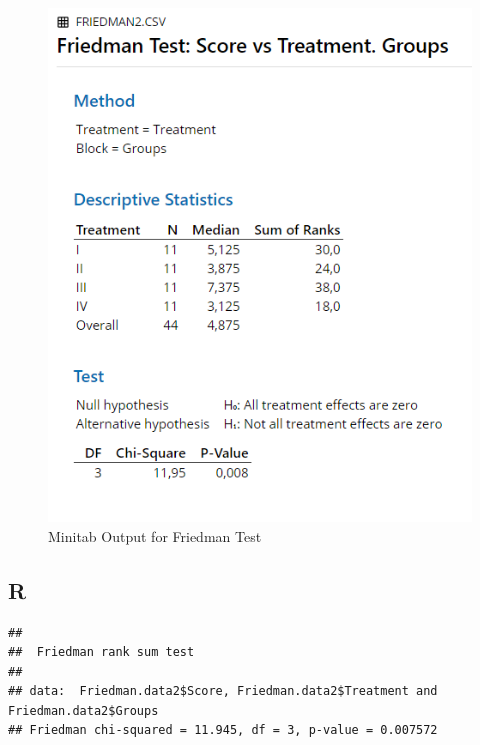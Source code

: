 \documentclass[
]{book}
\newenvironment{Shaded}{\begin{snugshade}}{\end{snugshade}}
\newcommand{\DataTypeTok}[1]{\textcolor[rgb]{0.13,0.29,0.53}{#1}}
\newcommand{\KeywordTok}[1]{\textcolor[rgb]{0.13,0.29,0.53}{\textbf{#1}}}
\newcommand{\NormalTok}[1]{#1}
\newcommand{\OperatorTok}[1]{\textcolor[rgb]{0.81,0.36,0.00}{\textbf{#1}}}
\begin{document}
\begin{figure}[!h]
\includegraphics{Screenshots/Friedman Test/FriedmanMinitab} \caption{\label{fig:FriedmanMinitab}Minitab Output for Friedman Test}\label{fig:FriedmanMinitab}
\end{figure}

\hypertarget{r-4}{%
\subsection{R}\label{r-4}}

\begin{Shaded}
\end{Shaded}

\begin{verbatim}
## 
## 	Friedman rank sum test
## 
## data:  Friedman.data2$Score, Friedman.data2$Treatment and Friedman.data2$Groups
## Friedman chi-squared = 11.945, df = 3, p-value = 0.007572
\end{verbatim}
\end{document}
